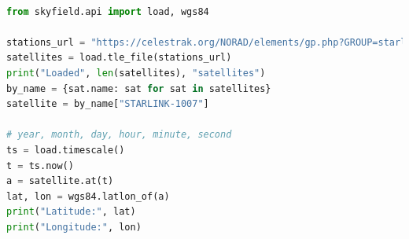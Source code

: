 \documentclass[]{report}
\begin{document}
\begin{lstlisting}[language=python,caption={retrieving a Satellite's position using the Satname},captionpos=b]

from skyfield.api import load, wgs84

stations_url = "https://celestrak.org/NORAD/elements/gp.php?GROUP=starlink&FORMAT=tle"
satellites = load.tle_file(stations_url)
print("Loaded", len(satellites), "satellites")
by_name = {sat.name: sat for sat in satellites}
satellite = by_name["STARLINK-1007"]

# year, month, day, hour, minute, second
ts = load.timescale()
t = ts.now()
a = satellite.at(t)
lat, lon = wgs84.latlon_of(a)
print("Latitude:", lat)
print("Longitude:", lon)
\end{lstlisting}

\clearpage
\printbibliography[heading=bibintoc]
\clearpage
\pagestyle{empty}
\end{document}
